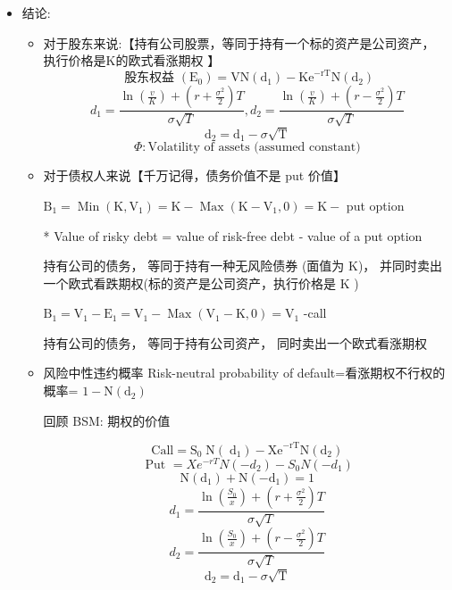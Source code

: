 \begin{itemize}
\begin{itemize}
\item 结论:
\begin{itemize}
    
\item 对于股东来说:【持有公司股票，等同于持有一个标的资产是公司资产， 执行价格是K的欧式看涨期权 】
\[\text{ 股东权益 }\left( {\mathrm{E}}_{0}\right)  = \mathrm{{VN}}\left( {\mathrm{d}}_{1}\right)  - {\mathrm{{Ke}}}^{-\mathrm{{rT}}}\mathrm{N}\left( {\mathrm{d}}_{2}\right)\]
\[{d}_{1} = \frac{\ln \left( \frac{v}{K}\right)  + \left( {r + \frac{{\sigma }^{2}}{2}}\right) T}{\sigma \sqrt{T}},{d}_{2} = \frac{\ln \left( \frac{v}{K}\right)  + \left( {r - \frac{{\sigma }^{2}}{2}}\right) T}{\sigma \sqrt{T}}\]
\[{\mathrm{d}}_{2} = {\mathrm{d}}_{1} - \sigma \sqrt{\mathrm{T}}\]
\[\Phi :\text{Volatility of assets (assumed constant)}\]

\item 对于债权人来说【千万记得，债务价值不是 put 价值】

 \({\mathrm{B}}_{1} = \operatorname{Min}\left( {\mathrm{K},{\mathrm{V}}_{1}}\right)  = \mathrm{K} - \operatorname{Max}\left( {\mathrm{K} - {\mathrm{V}}_{1},0}\right)  = \mathrm{K} -\) put option

* Value of risky debt = value of risk-free debt - value of a put option

 持有公司的债务， 等同于持有一种无风险债券 (面值为 K)， 并同时卖出一个欧式看跌期权(标的资产是公司资产，执行价格是 \(\mathrm{K}\) )

 \({\mathrm{B}}_{1} = {\mathrm{V}}_{1} - {\mathrm{E}}_{1} = {\mathrm{V}}_{1} - \operatorname{Max}\left( {{\mathrm{V}}_{1} - \mathrm{K},0}\right)  = {\mathrm{V}}_{1}\) -call

 持有公司的债务， 等同于持有公司资产， 同时卖出一个欧式看涨期权

\item 风险中性违约概率 Risk-neutral probability of default=看涨期权不行权的概率= \(1 - \mathrm{N}\left( {\mathrm{d}}_{2}\right)\) 

回顾 BSM: 期权的价值

\[\mathrm{{Call}} = {\mathrm{S}}_{0}\mathrm{\;N}\left( {\mathrm{\;d}}_{1}\right)  - {\mathrm{{Xe}}}^{-\mathrm{{rT}}}\mathrm{N}\left( {\mathrm{d}}_{2}\right)\]
\[\text{ Put } = X{e}^{-{rT}}N\left( {-{d}_{2}}\right)  - {S}_{0}N\left( {-{d}_{1}}\right)\]
\[\mathrm{N}\left( {\mathrm{d}}_{1}\right)  + \mathrm{N}\left( {-{\mathrm{d}}_{1}}\right)  = 1\]
\[{d}_{1} = \frac{\ln \left( \frac{{S}_{0}}{x}\right)  + \left( {r + \frac{{\sigma }^{2}}{2}}\right) T}{\sigma \sqrt{T}}\]
\[{d}_{2} = \frac{\ln \left( \frac{{S}_{0}}{x}\right)  + \left( {r - \frac{{\sigma }^{2}}{2}}\right) T}{\sigma \sqrt{T}}\]
\[{\mathrm{d}}_{2} = {\mathrm{d}}_{1} - \sigma \sqrt{\mathrm{T}}\]


\end{itemize}
\end{itemize}
\end{itemize}
